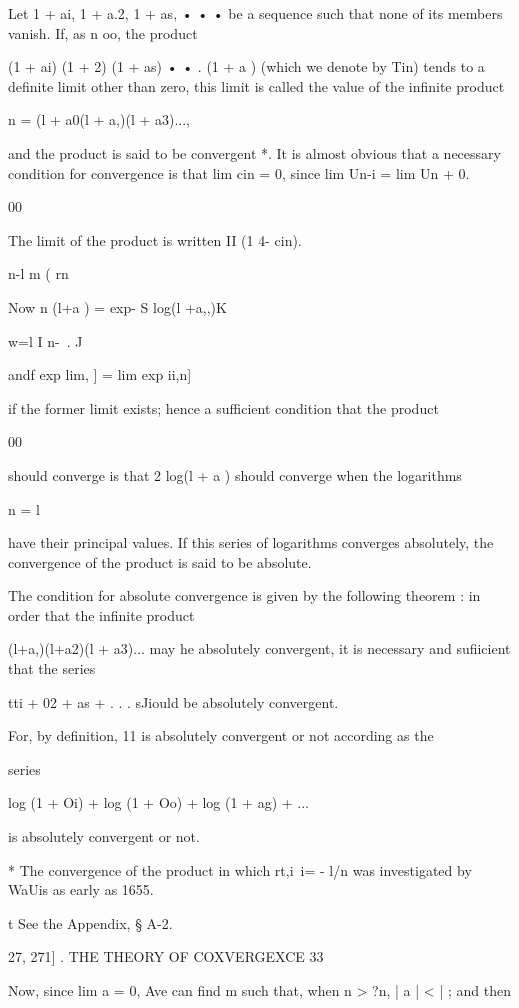Let 1 + ai, 1 + a.2, 1 + as, • • • be a sequence such that none of its
members vanish. If, as n oo, the product

(1 + ai) (1 + 2) (1 + as) • • . (1 + a ) (which we denote by Tin)
tends to a definite limit other than zero, this limit is called the
value of the infinite product

n = (l + a0(l + a,)(l + a3)...,

and the product is said to be convergent *. It is almost obvious that
a necessary condition for convergence is that lim cin = 0, since lim
Un-i = lim Un + 0.

00

The limit of the product is written II (1 4- cin).

n-l m ( rn \

Now n (l+a ) = exp- S log(l +a,,)K

w=l I n-\ . J

andf exp lim, ] = lim exp ii,n]

if the former limit exists; hence a sufficient condition that the
product

00

should converge is that 2 log(l + a ) should converge when the
logarithms

n = l

have their principal values. If this series of logarithms converges
absolutely, the convergence of the product is said to be absolute.

The condition for absolute convergence is given by the following
theorem : in order that the infinite product

(l+a,)(l+a2)(l + a3)... may he absolutely convergent, it is necessary
and sufiicient that the series

tti + 02 + as + . . . sJiould be absolutely convergent.

For, by definition, 11 is absolutely convergent or not according as
the

series

log (1 + Oi) + log (1 + Oo) + log (1 + ag) + ...

is absolutely convergent or not.

* The convergence of the product in which rt,i\ i= - l/n was
investigated by WaUis as early as 1655.

t See the Appendix, § A-2.



27, 271] . THE THEORY OF COXVERGEXCE 33

Now, since lim a = 0, Ave can find m such that, when n > ?n, | a | < |
; and then



